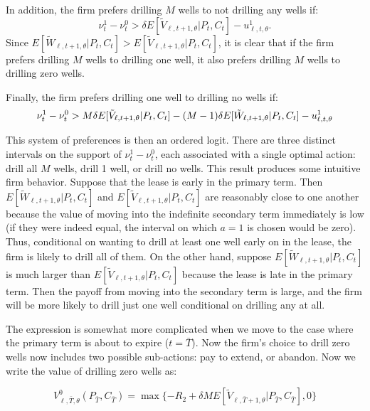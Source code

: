\documentclass[12pt]{article}
\begin{document}
\noindent In addition, the firm prefers drilling  $M$ wells to not drilling any wells if:
\begin{equation}
\nu^1_t - \nu^0_t > \delta E[\tilde{V}_{\ell,t+1,\theta}|P_t,C_t] - u^1_{\ell,t,\theta}.
\end{equation}
\noindent Since $E[\tilde{W}_{\ell,t+1,\theta}|P_t,C_t] > E[\tilde{V}_{\ell,t+1,\theta}|P_t,C_t]$, it is clear that if the firm prefers drilling $M$ wells to drilling one well, it also prefers drilling $M$ wells to drilling zero wells.

Finally, the firm prefers drilling one well to drilling no wells if:
\begin{equation}
\nu^1_t - \nu^0_t > M \delta E[\tilde{V}_{\ell,t+1,\theta}|P_t,C_t] - (M - 1) \delta E[\tilde{W}_{\ell,t+1,\theta}|P_t,C_t] - u^1_{\ell,t,\theta} \\
\end{equation}

This system of preferences is then an ordered logit. There are three distinct intervals on the support of $\nu^1_t - \nu^0_t$, each associated with a single optimal action: drill all $M$ wells, drill 1 well, or drill no wells. This result produces some intuitive firm behavior. Suppose that the lease is early in the primary term.  Then $E[\tilde{W}_{\ell,t+1,\theta}|P_t,C_t]$ and $E[\tilde{V}_{\ell,t+1,\theta}|P_t,C_t]$ are reasonably close to one another because the value of moving into the indefinite secondary term immediately is low (if they were indeed equal, the interval on which $a=1$ is chosen would be zero). Thus, conditional on wanting to drill at least one well early on in the lease, the firm is likely to drill all of them. On the other hand, suppose $E[\tilde{W}_{\ell,t+1,\theta}|P_t,C_t]$ is much larger than $E[\tilde{V}_{\ell,t+1,\theta}|P_t,C_t]$ because the lease is late in the primary term. Then the payoff from moving into the secondary term is large, and the firm will be more likely to drill just one well conditional on drilling any at all.

The expression is somewhat more complicated when we move to the case where the primary term is about to expire ($t = \bar{T}$). Now the firm's choice to drill zero wells now includes two possible sub-actions: pay to extend, or abandon. Now we write the value of drilling zero wells as:

\begin{equation}
V^0_{\ell,\bar{T},\theta}(P_{\bar{T}},C_{\bar{T}}) = \max \{ - R_2 + \delta M E[\tilde{V}_{\ell,\bar{T}+1,\theta}|P_{\bar{T}},C_{\bar{T}}] , 0 \}
\end{equation}
\end{document}
